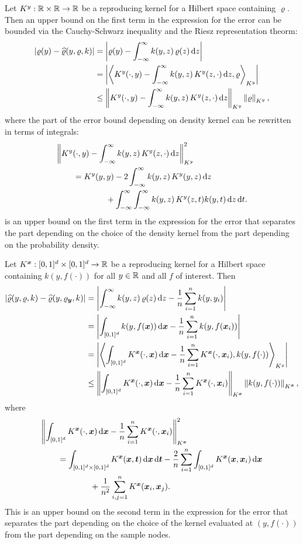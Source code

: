 \documentclass{amsart}
\newcommand{\hvarrho}{\widehat{\varrho}}
\newcommand{\KY}{K^y}
\newcommand{\KX}{K^{\vx}}
\begin{document}
Let $\KY:\reals \times \reals \to \reals$ be a reproducing kernel for a Hilbert space containing $\varrho$.  Then an upper bound on the first term in the expression for the error can be bounded via the Cauchy-Schwarz inequality and the Riesz representation theorm:
\begin{align}
\label{eq:firstbd}
\abs{\varrho(y) - \hvarrho(y,\varrho,k)}
& = \abs{\varrho(y) - \int_{-\infty}^{\infty} k(y,z) \, \varrho(z) \, \dif z} \\
\nonumber
& = \abs{\ip[\KY]{\KY(\cdot,y) - \int_{-\infty}^{\infty} k(y,z) \, \KY(z,\cdot) \,  \dif z}{\varrho} } \\
\nonumber
& \le  \norm[\KY]{\KY(\cdot,y) - \int_{-\infty}^{\infty} k(y,z) \, \KY(z,\cdot) \, \dif z} \norm[\KY]{\varrho},
\end{align}
where the part of the error bound depending on density kernel can be rewritten in terms of integrals:
\begin{align}
\label{eq:kquality}
\MoveEqLeft{\norm[\KY]{\KY(\cdot,y) - \int_{-\infty}^{\infty} k(y,z) \, \KY(z,\cdot) \, \dif z}^2} \\ \nonumber
&=  \KY(y,y) - 2 \int_{-\infty}^{\infty} k(y,z) \, \KY(y,z) \, \dif z \\ \nonumber
& \qquad \qquad + \int_{-\infty}^{\infty} \int_{-\infty}^{\infty}  k(y,z) \, \KY(z,t) k(y,t)\, \dif z \, \dif t.
\end{align}
 is an upper bound on the first term in the expression for the error that separates the part depending on the choice of the density kernel from the part depending on the probability density.

Let $\KX: [0,1]^d \times [0,1]^d\to \reals$ be a reproducing kernel for a Hilbert space containing $k(y,f(\cdot))$ for all $y \in \mathbb{R}$ and all $f$ of interest. Then
\begin{align*}
\abs{\hvarrho(y,\varrho,k) - \hvarrho(y,\varrho_{\vy},k)}
& = \abs{\int_{-\infty}^{\infty} k(y,z) \, \varrho(z) \, \dif z -
\frac 1n \sum_{i=1}^n k(y,y_i)} \\
& = \abs{\int_{[0,1]^d} k(y,f(\vx)) \, \dif \vx -
\frac 1n \sum_{i=1}^n k(y,f(\vx_i))} \\
& = \abs{\ip[\KY]{\int_{[0,1]^d} \KX(\cdot,\vx) \, \dif \vx -
\frac 1n \sum_{i=1}^n \KX(\cdot,\vx_i)}{k(y,f(\cdot)) }} \\
& \le  \norm[\KX]{\int_{[0,1]^d} \KX(\cdot,\vx) \, \dif \vx -
\frac 1n \sum_{i=1}^n \KX(\cdot,\vx_i)} \norm[\KX]{k(y,f(\cdot)) } ,
\end{align*}
where
\begin{align*}
\MoveEqLeft{\norm[\KX]{\int_{[0,1]^d} \KX(\cdot,\vx) \, \dif \vx -
\frac 1n \sum_{i=1}^n \KX(\cdot,\vx_i)}^2} \\
&=  \int_{[0,1]^d \times [0,1]^d} \KX(\vx,\vt) \, \dif \vx \, \dif \vt -
\frac 2n \sum_{i=1}^n \int_{[0,1]^d} \KX(\vx,\vx_i) \, \dif \vx \\
& \qquad \qquad + \frac 1{n^2} \sum_{i,j=1}^n  \KX(\vx_i,\vx_j) .
\end{align*}
This is an upper bound on the second term in the expression for the error that separates the part depending on the choice of the kernel evaluated at $(y,f(\cdot))$ from the part depending on the sample nodes.
\end{document}
